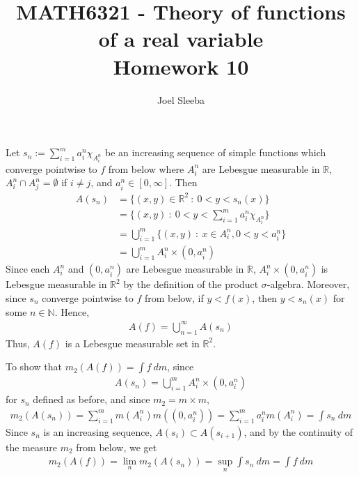 \documentclass[12pt]{exam}
\theoremstyle{plain} %
\theoremstyle{definition} %
\theoremstyle{remark} %
\begin{document}
\title{MATH6321 - Theory of functions of a real variable \\ Homework 10}

\author{
  Joel Sleeba \\
}

\maketitle
\printanswers
\unframedsolutions

\begin{questions}
  \question
  \begin{solution}
    Let $s_n := \sum_{i = 1}^{m} a_i^n \chi_{A_i^n}$ be an increasing
    sequence of
    simple functions which converge
    pointwise to $f$ from below
    where $A_i^n$ are Lebesgue measurable in $\mathbb{R}$,
    $A_i^n \cap A_j^n = \emptyset$ if $i \neq j$, and
    $a_i^n \in [0, \infty]$. Then
    \begin{align*}
      A(s_n) &= \{ (x, y) \in \mathbb{R}^2 \ : \  0 < y < s_n(x)  \} \\
      &= \{ (x, y) \ : \ 0 < y < \sum_{i = 1}^{m} a_i^n \chi_{A_i^n} \} \\
      &= \bigcup_{i = 1}^{m}\{ (x, y) \ : \ x \in A_i^n, 0 < y < a_i^n \}\\
      &= \bigcup_{i = 1}^{m} A_i^n \times (0, a_i^n)
    \end{align*}
    Since each $A_i^n$ and $(0, a_i^n)$ are Lebesgue measurable in
    $\mathbb{R}$, $A_i^n \times (0, a_i^n)$ is Lebesgue measurable in
    $\mathbb{R}^2$ by the definition of the product $\sigma$-algebra.
    Moreover, since $s_n$ converge pointwise to $f$ from below, if $y < f(x)$,
    then $y < s_n(x)$ for some $n \in \mathbb{N}$. Hence,
    \begin{align*}
      A(f) = \bigcup_{n = 1}^{\infty}A(s_n)
    \end{align*}
    Thus, $A(f)$ is a Lebesgue measurable set in
    $\mathbb{R}^2$.

    To show that $m_2(A(f)) = \int f \ d m$, since
    \begin{align*}
      A(s_n) = \bigcup_{i = 1}^{m} A_i^n \times (0, a_i^n)
    \end{align*}
    for $s_n$ defined as before, and since $m_2 = m \times m$,
    \begin{align*}
      m_2(A(s_n)) = \sum_{i = 1}^{m} m(A_i^n) m((0, a_i^n)) = \sum_{i
      = 1}^{m}  a_i^n m(A_i^n) = \int s_n \ d m
    \end{align*}
    Since $s_n$ is an increasing sequence, $A(s_i) \subset
    A(s_{i+1})$, and by the continuity of the measure $m_2$ from below, we get
    \begin{align*}
      m_2(A(f)) = \lim_n m_2(A(s_n)) = \sup_n \int s_n \ d m = \int f \ d m
    \end{align*}
  \end{solution}


\end{questions}
\end{document}
